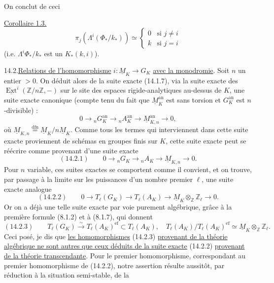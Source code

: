 On conclut de ceci 

\uline{Corollaire 1.3.}
\[
\pi_j(\Lambda^i(\Phi_*/k_*))\simeq
\begin{cases}0&\text{si }j\ne i\\k&\text{si }j=i\end{cases}
\]
(i.e. $\Lambda^i\Phi_*/k_*$ est un $K_*(k,i)$).

14.2.\quad\uline{Relations de l'homomorphisme} $i:\underline M_K\longrightarrow G_K$
\uline{avec la monodromie}. Soit $n$ un entier $>0$. On déduit alors de la suite exacte (14.1.7), via la
suite exacte des $\underline{\operatorname{Ext}}^i(\mathbb Z/n\mathbb Z,-)$ sur le site des espaces rigide-analytiques
au-dessus de $K$, une suite exacte canonique (compte tenu du fait que
$\underline M_K^{\mathrm{an}}$ est sans torsion et $G_K^{\mathrm{an}}$ est $n$-divisible) :
\[
0\longrightarrow{}_nG_K^{\mathrm{an}}\longrightarrow{}_nA_K^{\mathrm{an}}
\longrightarrow\underline M_{K,n}^{\mathrm{an}}\longrightarrow0,
\]
où $\underline M_{K,n}\overset{\mathrm{dfn}}=\underline M_K/n\underline M_K$.
Comme tous les termes qui interviennent dans cette suite exacte proviennent de schémas en groupes finis sur $K$,
cette suite exacte peut se réécrire comme provenant d'une suite exacte
\[
(14.2.1)\qquad0\longrightarrow{}_nG_K\longrightarrow{}_nA_K
\longrightarrow\underline M_{K,n}\longrightarrow0.
\]
Pour $n$ variable, ces suites exactes se comportent comme il convient,
et on trouve, par passage à la limite sur les puissances d'un nombre premier $\ell$, une suite exacte analogue
\[
(14.2.2)\qquad0\longrightarrow T_\ell(G_K)\longrightarrow T_\ell(A_K)
\longrightarrow\underline M_K\otimes_{\mathbb Z}\mathbb Z_\ell\longrightarrow0.
\]
Or on a déjà une telle suite exacte par voie purement algébrique, grâce
à la première formule (8.1.2) et à (8.1.7), qui donnent
\[
(14.2.3)\qquad T_\ell(G_K)\xrightarrow{\sim}T_\ell(A_K)^{\mathrm{ef}}\subset T_\ell(A_K),
\quad T_\ell(A_K)/T_\ell(A_K)^{\mathrm{ef}}\simeq\underline M_K\otimes_{\mathbb Z}\mathbb Z_\ell.
\]
Ceci posé, je dis que \uline{les homomorphismes} (14.2.3)
\uline{provenant de la théorie algébrique ne sont autres que ceux déduits de la suite exacte} (14.2.2)
\uline{provenant de la théorie transcendante}. Pour le premier homomorphisme,
correspondant au premier homomorphisme de (14.2.2), notre assertion
résulte aussitôt, par réduction à la situation semi-stable, de la

